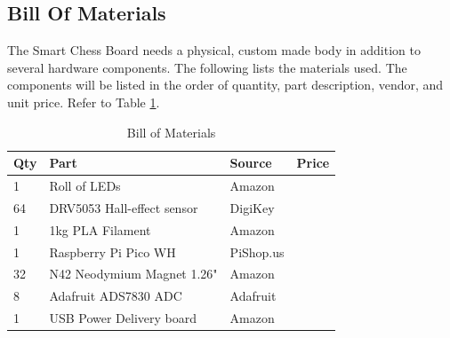 \documentclass[11pt,journal]{IEEEtran}
\begin{document}
\subsection{Bill Of Materials}
The Smart Chess Board needs a physical, custom made body in addition to several hardware components. The following lists the materials used. The components will be listed in the order of quantity, part description, vendor, and unit price. Refer to Table \ref{bomtable}.
\begin{center}
\begin{table}[ht]
\caption{Bill of Materials}
\begin{tabular}{|l|l|l|l|}
\hline
\textbf{Qty} & \textbf{Part}                        & \textbf{Source} & \textbf{Price}          \\ \hline
1            & Roll of LEDs                         & Amazon          &                         \\ \hline
64           & DRV5053 Hall-effect  sensor          & DigiKey         &                         \\ \hline
1            & 1kg PLA Filament                     & Amazon          &                         \\ \hline
1            & Raspberry Pi Pico WH                 & PiShop.us       &                         \\ \hline
32           & N42 Neodymium Magnet 1.26"           & Amazon          &                         \\ \hline
8            & Adafruit ADS7830 ADC                 & Adafruit        &                         \\ \hline
1            & USB Power Delivery board             & Amazon          &                         \\ \hline
\end{tabular}
\label{bomtable}
\end{table}
\end{center}


% 
\end{document}
